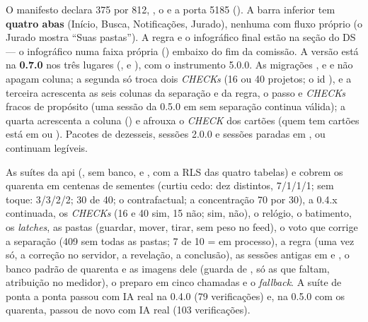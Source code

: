 \begin{atencao}
O manifesto declara  375 por 812, , o
  e a porta 5185 (). A barra
inferior tem \textbf{quatro abas} (Início, Busca, Notificações, Jurado),
nenhuma com fluxo próprio (o Jurado mostra \enquote{Suas pastas}). A regra e
o infográfico final estão na seção  do DS --- o infográfico numa faixa própria ()
embaixo do fim da comissão. A versão está na \textbf{0.7.0} nos três lugares
(,  e ), com o
instrumento 5.0.0. As migrações
,
 e
 e
 não apagam
coluna; a segunda só troca dois \emph{CHECKs} (16 ou 40 projetos; o id
), e a terceira acrescenta as seis colunas da separação e da
regra, o passo  e \emph{CHECKs} fracos de propósito (uma
sessão da 0.5.0 em  sem separação continua válida); a quarta
acrescenta a coluna  () e afrouxa o \emph{CHECK} dos
cartões (quem tem cartões está em  ou ). Pacotes de
dezesseis, sessões 2.0.0 e sessões paradas em ,
 ou  continuam legíveis.
\end{atencao}

As suítes da api (, sem banco,
e , com a RLS das quatro
tabelas) e  cobrem os
quarenta em centenas de sementes (curtiu cedo: dez distintos, 7/1/1/1; sem
toque: 3/3/2/2; 30 de 40; o contrafactual; a concentração 70 por 30), a 0.4.x
continuada, os \emph{CHECKs} (16 e 40 sim, 15 não;  sim,
 não), o relógio, o batimento, os \emph{latches}, as pastas
(guardar, mover, tirar, sem peso no feed), o voto que corrige a separação
(409 sem todas as pastas; 7 de 10 = em processo), a regra (uma vez só, a
correção no servidor, a revelação, a conclusão), as sessões antigas em
 e , o banco padrão de quarenta e as imagens dele (guarda de ,
só as que faltam, atribuição no medidor), o preparo em cinco chamadas e o
\emph{fallback}. A suíte de ponta a ponta
 passou com IA real na
0.4.0 (79 verificações) e, na 0.5.0 com os quarenta, passou de novo com IA
real (103 verificações).

